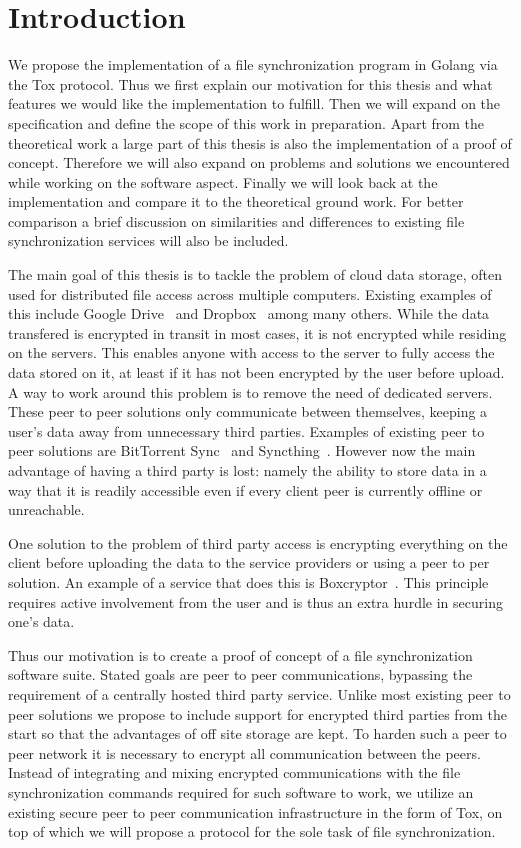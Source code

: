 \chapter{Introduction}
\label{chap:Introduction}

We propose the implementation of a file synchronization program in Golang via the Tox protocol.
Thus we first explain our motivation for this thesis and what features we would like the implementation to fulfill.
Then we will expand on the specification and define the scope of this work in preparation.
Apart from the theoretical work a large part of this thesis is also the implementation of a proof of concept.
Therefore we will also expand on problems and solutions we encountered while working on the software aspect.
Finally we will look back at the implementation and compare it to the theoretical ground work.
For better comparison a brief discussion on similarities and differences to existing file synchronization services will also be included.

The main goal of this thesis is to tackle the problem of cloud data storage, often used for distributed file access across multiple computers.
Existing examples of this include Google Drive~\cite{web:site:gdrive} and Dropbox~\cite{web:site:dropbox} among many others.
While the data transfered is encrypted in transit in most cases, it is not encrypted while residing on the servers.
This enables anyone with access to the server to fully access the data stored on it, at least if it has not been encrypted by the user before upload.
A way to work around this problem is to remove the need of dedicated servers.
These peer to peer solutions only communicate between themselves, keeping a user's data away from unnecessary third parties.
Examples of existing peer to peer solutions are BitTorrent Sync~\cite{web:site:bittorrent_sync} and Syncthing~\cite{web:site:synthing}.
However now the main advantage of having a third party is lost: namely the ability to store data in a way that it is readily accessible even if every client peer is currently offline or unreachable.

One solution to the problem of third party access is encrypting everything on the client before uploading the data to the service providers or using a peer to per solution.
An example of a service that does this is Boxcryptor~\cite{web:site:boxcryptor}.
This principle requires active involvement from the user and is thus an extra hurdle in securing one's data.

Thus our motivation is to create a proof of concept of a file synchronization software suite.
Stated goals are peer to peer communications, bypassing the requirement of a centrally hosted third party service.
Unlike most existing peer to peer solutions we propose to include support for encrypted third parties from the start so that the advantages of off site storage are kept.
To harden such a peer to peer network it is necessary to encrypt all communication between the peers.
Instead of integrating and mixing encrypted communications with the file synchronization commands required for such software to work, we utilize an existing secure peer to peer communication infrastructure in the form of Tox, on top of which we will propose a protocol for the sole task of file synchronization.

